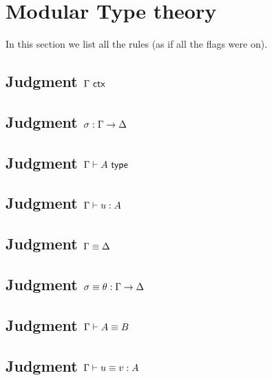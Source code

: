 \documentclass{article}
\begin{document}


\section*{Modular Type theory}
\label{sec:type-theory}

In this section we list all the rules (as if all the flags were on).

\subsection*{Judgment $\Gamma\ \mathsf{ctx}$}

\showIsctxRules

\subsection*{Judgment $\sigma : \Gamma \to \Delta$}

\showIssubstRules

\subsection*{Judgment $\Gamma \vdash A \ \mathsf{type}$}

\showIstypeRules

\subsection*{Judgment $\Gamma \vdash u : A$}

\showIstermRules

\subsection*{Judgment $\Gamma \equiv \Delta$}

\showEqctxRules

\subsection*{Judgment $\sigma \equiv \theta : \Gamma \to \Delta$}

\showEqsubstRules

\subsection*{Judgment $\Gamma \vdash A \equiv B$}

\showEqtypeRules

\subsection*{Judgment $\Gamma \vdash u \equiv v : A$}

\showEqtermRules
\end{document}
